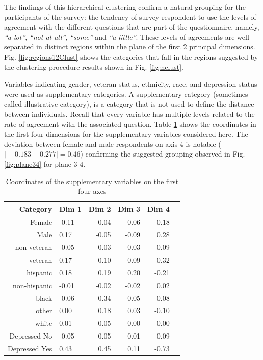 \documentclass[conference,final,]{IEEEtran}
\begin{document}
The findings of this hierarchical clustering confirm a natural grouping
for the participants of the survey: the tendency of survey respondent to
use the levels of agreement with the different questions that are part
of the questionnaire, namely, \emph{``a lot''}, \emph{``not at all''},
\emph{``some''} and \emph{``a little''}. These levels of agreements are
well separated in distinct regions within the plane of the first 2
principal dimensions. Fig. \ref{fig:regions12Clust} shows the categories
that fall in the regions suggested by the clustering procedure results
shown in Fig. \ref{fig:hclust}.

Variables indicating gender, veteran status, ethnicity, race, and
depression status were used as supplementary categories. A supplementary
category (sometimes called illustrative category), is a category that is
not used to define the distance between individuals. Recall that every
variable has multiple levels related to the rate of agreement with the
associated question. Table \ref{tab:supplCoord} shows the coordinates in
the first four dimensions for the supplementary variables considered
here. The deviation between female and male respondents on axis 4 is
notable (\(\vert -0.183 - 0.277 \vert = 0.46\)) confirming the suggested
grouping observed in Fig. \ref{fig:plane34} for plane 3-4.

\begin{table}[ht]
\caption{Coordinates of the supplementary variables on the first four axes} 
\centering
\begin{tabular}{rlrrrr}
  \hline
  Category & Dim 1 & Dim 2 & Dim 3 & Dim 4 \\ 
  \hline
  \hline
  Female & -0.11 & 0.04 & 0.06 & -0.18 \\ 
  Male & 0.17 & -0.05 & -0.09 & 0.28 \\ 
  \hline
  non-veteran & -0.05 & 0.03 & 0.03 & -0.09 \\ 
  veteran & 0.17 & -0.10 & -0.09 & 0.32 \\ 
  \hline
  hispanic & 0.18 & 0.19 & 0.20 & -0.21 \\ 
  non-hispanic & -0.01 & -0.02 & -0.02 & 0.02 \\ 
  \hline
  black & -0.06 & 0.34 & -0.05 & 0.08 \\ 
  other & 0.00 & 0.18 & 0.03 & -0.10 \\ 
  white & 0.01 & -0.05 & 0.00 & -0.00 \\ 
  \hline
  Depressed No & -0.05 & -0.05 & -0.01 & 0.09 \\ 
  Depressed Yes & 0.43 & 0.45 & 0.11 & -0.73 \\ 
   \hline
\end{tabular}
\label{tab:supplCoord}
\end{table}
\end{document}
